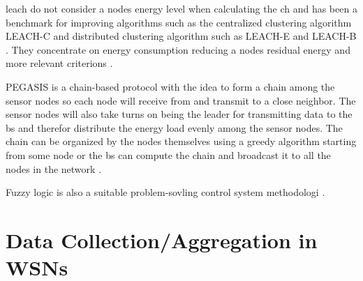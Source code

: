 \documentclass[USenglish]{uit-thesis}
\begin{document}



\gls{leach} do not consider a nodes energy level when calculating the \gls{ch} and has been a benchmark for improving algorithms such as the centralized clustering algorithm LEACH-C \cite {leach_c} and distributed clustering algorithm such as LEACH-E \cite{leach_e} and LEACH-B \cite{leach_b}. They concentrate on energy consumption reducing a nodes residual energy and more relevant criterions \cite{dec_cb_alg}.




PEGASIS is a chain-based protocol with the idea to form a chain among the sensor nodes so each node will receive from and transmit to a close neighbor. The sensor nodes will also take turns on being the leader for transmitting data to the \gls{bs} and therefor distribute the energy load evenly among the sensor nodes. The chain can be organized by the nodes themselves using a greedy algorithm starting from some node or the \gls{bs} can compute the chain and broadcast it to all the nodes in the network \cite{pegasis}.

Fuzzy logic is also a suitable problem-sovling control system methodologi \cite{fuzzy_logic}.



\section{Data Collection/Aggregation in WSNs}

\end{document}
